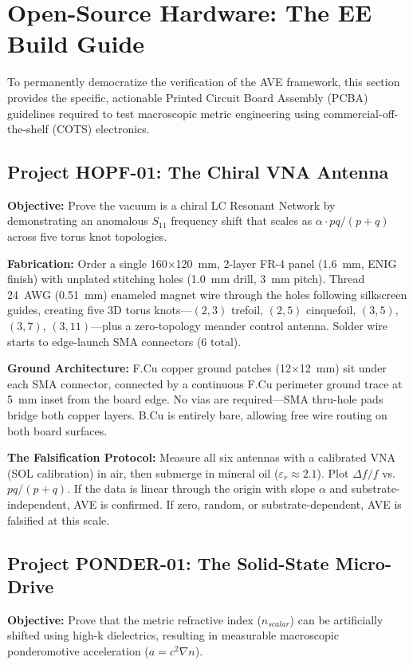 \section{Open-Source Hardware: The EE Build Guide}

To permanently democratize the verification of the AVE framework, this section provides the specific, actionable Printed Circuit Board Assembly (PCBA) guidelines required to test macroscopic metric engineering using commercial-off-the-shelf (COTS) electronics.

\subsection{Project HOPF-01: The Chiral VNA Antenna}
\textbf{Objective:} Prove the vacuum is a chiral LC Resonant Network by demonstrating an anomalous $S_{11}$ frequency shift that scales as $\alpha \cdot pq/(p+q)$ across five torus knot topologies.

\textbf{Fabrication:} Order a single 160$\times$120~mm, 2-layer FR-4 panel (1.6~mm, ENIG finish) with unplated stitching holes (1.0~mm drill, 3~mm pitch). Thread 24~AWG (0.51~mm) enameled magnet wire through the holes following silkscreen guides, creating five 3D torus knots---$(2,3)$ trefoil, $(2,5)$ cinquefoil, $(3,5)$, $(3,7)$, $(3,11)$---plus a zero-topology meander control antenna. Solder wire starts to edge-launch SMA connectors (6 total).

\textbf{Ground Architecture:} F.Cu copper ground patches (12$\times$12~mm) sit under each SMA connector, connected by a continuous F.Cu perimeter ground trace at 5~mm inset from the board edge. No vias are required---SMA thru-hole pads bridge both copper layers. B.Cu is entirely bare, allowing free wire routing on both board surfaces.

\textbf{The Falsification Protocol:} Measure all six antennas with a calibrated VNA (SOL calibration) in air, then submerge in mineral oil ($\varepsilon_r \approx 2.1$). Plot $\Delta f/f$ vs.\ $pq/(p+q)$. If the data is linear through the origin with slope $\alpha$ and substrate-independent, AVE is confirmed. If zero, random, or substrate-dependent, AVE is falsified at this scale.

\subsection{Project PONDER-01: The Solid-State Micro-Drive}
\textbf{Objective:} Prove that the metric refractive index ($n_{scalar}$) can be artificially shifted using high-k dielectrics, resulting in measurable macroscopic ponderomotive acceleration ($a = c^2 \nabla n$).

